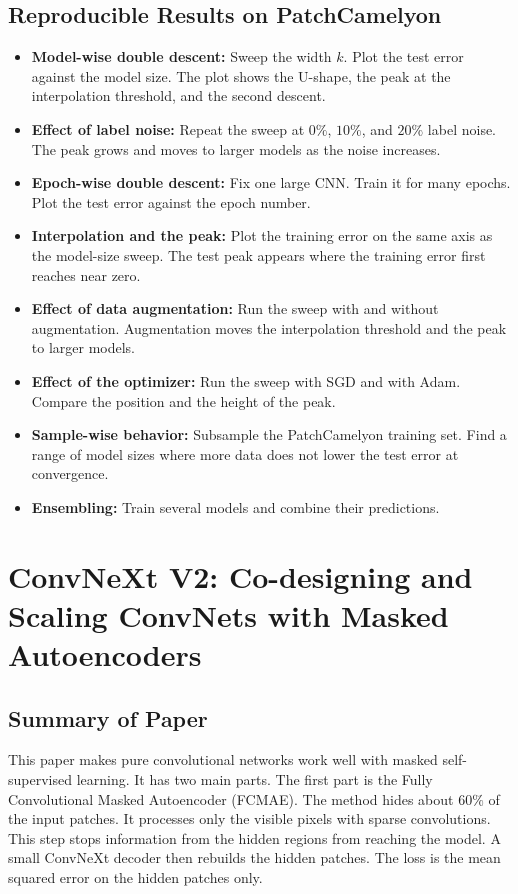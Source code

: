\documentclass[11pt]{article}
\begin{document}
\subsection*{Reproducible Results on PatchCamelyon}
\begin{itemize}
  \item \textbf{Model-wise double descent:} Sweep the width $k$. Plot the test
        error against the model size. The plot shows the U-shape, the peak at the
        interpolation threshold, and the second descent.
  \item \textbf{Effect of label noise:} Repeat the sweep at $0\%$, $10\%$, and
        $20\%$ label noise. The peak grows and moves to larger models as the
        noise increases.
  \item \textbf{Epoch-wise double descent:} Fix one large CNN. Train it for many
        epochs. Plot the test error against the epoch number.
  \item \textbf{Interpolation and the peak:} Plot the training error on the same
        axis as the model-size sweep. The test peak appears where the training
        error first reaches near zero.
  \item \textbf{Effect of data augmentation:} Run the sweep with and without
        augmentation. Augmentation moves the interpolation threshold and the peak
        to larger models.
  \item \textbf{Effect of the optimizer:} Run the sweep with SGD and with Adam.
        Compare the position and the height of the peak.
  \item \textbf{Sample-wise behavior:} Subsample the PatchCamelyon training set.
        Find a range of model sizes where more data does not lower the test error
        at convergence.
  \item \textbf{Ensembling:} Train several models and combine their
        predictions.
\end{itemize}

\section{ConvNeXt V2: Co-designing and Scaling ConvNets with Masked Autoencoders}
\label{sec:convnextv2}

\subsection*{Summary of Paper}
This paper makes pure convolutional networks work well with masked self-supervised
learning. It has two main parts. The first part is the Fully Convolutional Masked
Autoencoder (FCMAE). The method hides about $60\%$ of the input patches. It
processes only the visible pixels with sparse convolutions. This step stops
information from the hidden regions from reaching the model. A small ConvNeXt
decoder then rebuilds the hidden patches. The loss is the mean squared error on
the hidden patches only.
\end{document}
